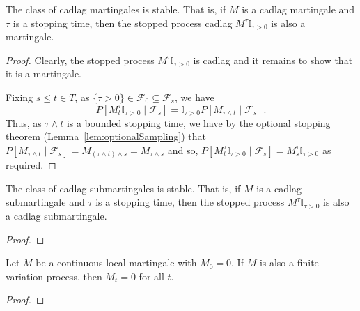 \begin{lemma}\label{lem:stable_IsMartingale}
  \leanok
The class of cadlag martingales is stable. That is, if $M$ is a cadlag martingale and $\tau$ is a stopping time, then the stopped process cadlag $M^{\tau}\mathbb{I}_{\tau > 0}$ is also a martingale.
\end{lemma}

\begin{proof}
  \leanok
  Clearly, the stopped process $M^{\tau}\mathbb{I}_{\tau > 0}$ is cadlag and it remains to show that it is a martingale.

  Fixing $s \le t \in T$, as $\{\tau > 0\} \in \mathcal{F}_0 \subseteq \mathcal{F}_s$, we have
  $$P[M^{\tau}_t \mathbb{I}_{\tau > 0} \mid \mathcal{F}_s] = \mathbb{I}_{\tau > 0}P[M_{\tau \wedge t} \mid \mathcal{F}_{s}].$$
  Thus, as $\tau \wedge t$ is a bounded stopping time, we have by the optional stopping theorem
  (Lemma~\ref{lem:optionalSampling}) that $P[M_{\tau \wedge t} \mid \mathcal{F}_{s}] = M_{(\tau \wedge t) \wedge s} = M_{\tau \wedge s}$
  and so, $P[M^{\tau}_t \mathbb{I}_{\tau > 0} \mid \mathcal{F}_s] = M^{\tau}_s \mathbb{I}_{\tau > 0}$ as required.
\end{proof}


\begin{lemma}\label{lem:stable_IsSubmartingale}
  \leanok
The class of cadlag submartingales is stable. That is, if $M$ is a cadlag submartingale and $\tau$ is a stopping time, then the stopped process $M^{\tau}\mathbb{I}_{\tau > 0}$ is also a cadlag submartingale.
\end{lemma}

\begin{proof}

\end{proof}


\begin{theorem}\label{thm:IsLocalMartingale.eq_zero_of_finiteVariation}
Let $M$ be a continuous local martingale with $M_0 = 0$. If $M$ is also a finite variation process, then $M_t = 0$ for all $t$.
\end{theorem}

\begin{proof}

\end{proof}



